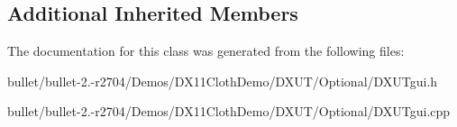 \subsection*{Additional Inherited Members}


The documentation for this class was generated from the following files\+:\begin{DoxyCompactItemize}
\item 
bullet/bullet-\/2.-\/r2704/\+Demos/\+D\+X11\+Cloth\+Demo/\+D\+X\+U\+T/\+Optional/D\+X\+U\+Tgui.\+h\item 
bullet/bullet-\/2.-\/r2704/\+Demos/\+D\+X11\+Cloth\+Demo/\+D\+X\+U\+T/\+Optional/D\+X\+U\+Tgui.\+cpp\end{DoxyCompactItemize}
